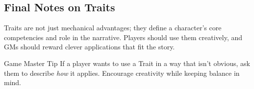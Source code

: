  
\subsection{Final Notes on Traits}

Traits are not just mechanical advantages; they define a character’s core competencies and role in the narrative. Players should use them creatively, and GMs should reward clever applications that fit the story.

\begin{DndComment}{Game Master Tip}
 	If a player wants to use a Trait in a way that isn’t obvious, ask them to describe \emph{how} it applies. Encourage creativity while keeping balance in mind.
\end{DndComment}


